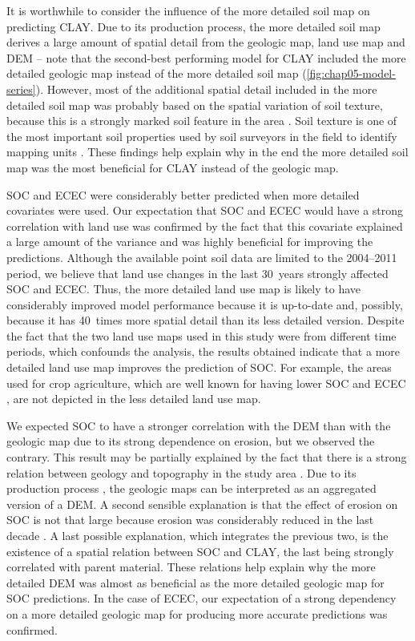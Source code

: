 It is worthwhile to consider the influence of the more detailed soil map on predicting CLAY. Due to its 
production process, the more detailed soil map derives a large amount of spatial detail from the geologic map, 
land use map and DEM -- note that the second-best performing model for CLAY included the more detailed 
geologic map instead of the more detailed soil map (\autoref{fig:chap05-model-series}). However, most of the 
additional spatial detail included in the more detailed soil map was probably based on the spatial variation of 
soil texture, because this is a strongly marked soil feature in the area \cite{MiguelEtAl2012}. Soil texture is 
one of the most important soil properties used by soil surveyors in the field to identify mapping units 
\cite{Legros2006}. These findings help explain why in the end the more detailed soil map was the most 
beneficial for CLAY instead of the geologic map.

SOC and ECEC were considerably better predicted when more detailed covariates were used. Our expectation that 
SOC and ECEC would have a strong correlation with land use was confirmed by the fact that this covariate 
explained a large amount of the variance and was highly beneficial for improving the predictions. Although the 
available point soil data are limited to the \num{2004}--\num{2011} period, we believe that land use changes 
in the last \num{30}~years \cite{MiguelEtAl2012, TenCatenEtAl2012b} strongly affected SOC and ECEC. Thus, the 
more detailed land use map is likely to have considerably improved model performance because it is up-to-date 
and, possibly, because it has \num{40}~times more spatial detail than its less detailed version. Despite the 
fact that the two land use maps used in this study were from different time periods, which confounds the 
analysis, the results obtained indicate that a more detailed land use map improves the prediction of SOC. For 
example, the areas used for crop agriculture, which are well known for having lower SOC and ECEC 
\cite{Menezes2008, MouraBueno2012}, are not depicted in the less detailed land use map.

We expected SOC to have a stronger correlation with the DEM than with the geologic map due to its strong 
dependence on erosion, but we observed the contrary. This result may be partially explained by the fact that 
there is a strong relation between geology and topography in the study area \cite{Sartori2009}. Due to its 
production process \cite{MacielFilho1990}, the geologic maps can be interpreted as an aggregated version of a 
DEM. A second sensible explanation is that the effect of erosion on SOC is not that large because erosion was 
considerably reduced in the last decade \cite{MiguelEtAl2012, TenCatenEtAl2012b}. A last possible explanation, 
which integrates the previous two, is the existence of a spatial relation between SOC and CLAY, the last being 
strongly correlated with parent material. These relations help explain why the more detailed DEM was almost as 
beneficial as the more detailed geologic map for SOC predictions. In the case of ECEC, our expectation of a 
strong dependency on a more detailed geologic map for producing more accurate predictions was confirmed.

